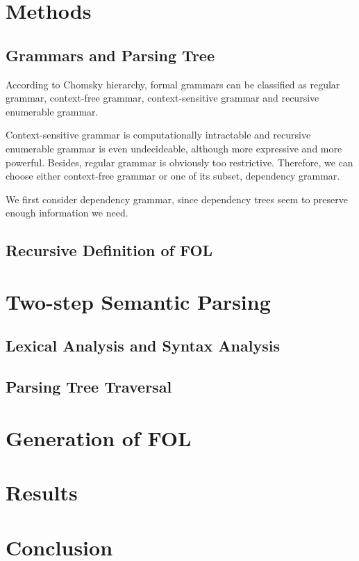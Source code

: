 \documentclass{article}
\begin{document}
\section{Methods}{
	\subsection{Grammars and Parsing Tree}{
		According to Chomsky hierarchy, formal grammars can be classified as regular grammar, context-free grammar, context-sensitive grammar and recursive enumerable grammar. 

		Context-sensitive grammar is computationally intractable and recursive enumerable grammar is even undecideable, although more expressive and more powerful. Besides, regular grammar is obviously too restrictive. Therefore, we can choose either context-free grammar or one of its subset, dependency grammar. 

		We first consider dependency grammar, since dependency trees seem to preserve enough information we need. 
	}

	\subsection{Recursive Definition of FOL}{}
}

\section{Two-step Semantic Parsing}{
	\subsection{Lexical Analysis and Syntax Analysis}{}

	\subsection{Parsing Tree Traversal}{}
}

\section{Generation of FOL}{}

\section{Results}{}

\section{Conclusion}{}



\citation
\end{document}
